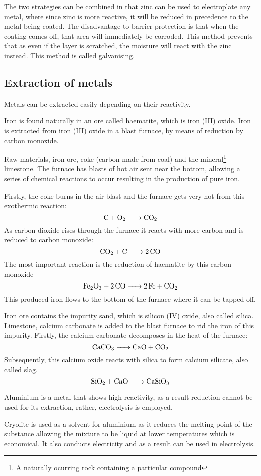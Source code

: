 The two strategies can be combined in that zinc can be used to electroplate any metal, where since
zinc is more reactive, it will be reduced in precedence to the metal being coated. The disadvantage
to barrier protection is that when the coating comes off, that area will immediately be corroded.
This method prevents that as even if the layer is scratched, the moisture will react with the zinc
instead. This method is called galvanising.

\subsection{Extraction of metals}
Metals can be extracted easily depending on their reactivity.

Iron is found naturally in an ore called haematite, which is iron (III) oxide. Iron is extracted
from iron (III) oxide in a blast furnace, by means of reduction by carbon monoxide.

Raw materials, iron ore, coke (carbon made from coal) and the mineral\footnote{A naturally ocurring
rock containing a particular compound} limestone. The furnace has blasts of hot air sent near
the bottom, allowing a series of chemical reactions to occur resulting in the production of pure
iron.

Firstly, the coke burns in the air blast and the furnace gets very hot from this exothermic
reaction:
$$ \ce{C + O2 -> CO2} $$
As carbon dioxide rises through the furnace it reacts with more carbon and is reduced to carbon
monoxide:
$$ \ce{CO2 + C -> 2CO} $$
The most important reaction is the reduction of haematite by this carbon monoxide
$$ \ce{Fe2O3 + 2CO -> 2Fe + CO2} $$
This produced iron flows to the bottom of the furnace where it can be tapped off.

Iron ore contains the impurity sand, which is silicon (IV) oxide, also called silica. Limestone,
calcium carbonate
is added to the blast furnace to rid the iron of this impurity. Firstly, the calcium carbonate
decomposes in the heat of the furnace:
$$ \ce{CaCO3 -> CaO + CO2} $$
Subsequently, this calcium oxide reacts with silica to form calcium silicate, also called slag.
$$ \ce{SiO2 + CaO -> CaSiO3} $$

Aluminium is a metal that shows high reactivity, as a result reduction cannot be used for its 
extraction, rather, electrolysis is employed.

Cryolite is used as a solvent for aluminium as it reduces the melting point of the substance 
allowing the mixture to be liquid at lower temperatures which is economical. It also conducts
electricity and as a result can be used in electrolysis.

